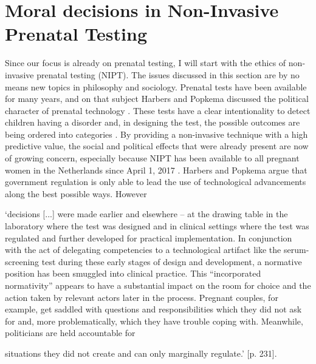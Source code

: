 \section{Moral decisions in Non-Invasive Prenatal Testing}             
Since our focus is already on prenatal testing, I will start with the ethics of non-invasive prenatal testing (NIPT). 
The issues discussed in this section are by no means new topics in philosophy and sociology. 
Prenatal tests have been available for many years, and on that subject Harbers and Popkema discussed the political character of prenatal technology \cite{Harbers_2005}. 
These tests have a clear intentionality to detect children having a disorder and, in designing the test, the possible outcomes are being ordered into categories \cite{Stephenson_2017}. 
By providing a non-invasive technique with a high predictive value, the social and political effects that were already present are now of growing concern, especially because NIPT has been available to all pregnant women in the Netherlands since April 1, 2017 \cite{niptconsortium_2017a}. 
Harbers and Popkema argue that government regulation is only able to lead the use of technological advancements along the best possible ways. 
However \newline 

\hfill\begin{minipage}{\dimexpr\textwidth-1cm}
‘decisions [...] were made earlier and elsewhere – at the drawing table in the laboratory where the test was designed and in clinical settings where the test was regulated and further developed for practical implementation. 
In conjunction with the act of delegating competencies to a technological artifact like the serum-screening test during these early stages of design and development, a normative position has been smuggled into clinical practice.
This “incorporated normativity” appears to have a substantial impact on the room for choice and the action taken by relevant actors later in the process.
Pregnant couples, for example, get saddled with questions and responsibilities which they did not ask for and, more problematically, which they have trouble coping with.  
Meanwhile, politicians are held accountable for 
\end{minipage}

\hfill\begin{minipage}{\dimexpr\textwidth-1cm}
situations they did not create and can only marginally regulate.’ \cite{Harbers_2005}[p. 231].
\end{minipage} \newline \newline

